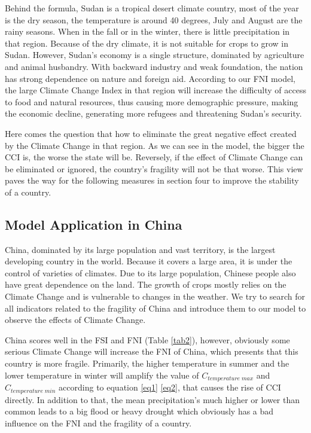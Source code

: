 \documentclass[a4paper,12pt]{article}
\begin{document}
Behind the formula, Sudan is a tropical desert climate country, most of the year is the dry season, the temperature is around 40 degrees, July and August are the rainy seasons. When in the fall or in the winter, there is little precipitation in that region. Because of the dry climate, it is not suitable for crops to grow in Sudan. However, Sudan's economy is a single structure, dominated by agriculture and animal husbandry. With backward industry and weak foundation, the nation has strong dependence on nature and foreign aid. According to our FNI model, the large Climate Change Index in that region will increase the difficulty of access to food and natural resources, thus causing more demographic pressure, making the economic decline, generating more refugees and threatening Sudan's security.

Here comes the question that how to eliminate the great negative effect created by the Climate Change in that region. As we can see in the model, the bigger the CCI is, the worse the state will be. Reversely, if the effect of Climate Change can be eliminated or ignored, the country's fragility will not be that worse. This view paves the way for the following measures in section four to improve the stability of a country.  

\subsection{Model Application in China}

China, dominated by its large population and vast territory, is the largest developing country in the world. Because it covers a large area, it is under the control of varieties of climates. Due to its large population, Chinese people also have great dependence on the land. The growth of crops mostly relies on the Climate Change and is vulnerable to changes in the weather. We try to search for all indicators related to the fragility of China and introduce them to our model to observe the effects of Climate Change.

China scores well in the FSI and FNI (Table \ref{tab2}), however, obviously some serious Climate Change will increase the FNI of China, which presents that this country is more fragile. Primarily, the higher temperature in summer and the lower temperature in winter will amplify the value of $C_{temperature\;max}$ and $C_{temperature\;min}$ according to equation \eqref{eq1} \eqref{eq2}, that causes the rise of CCI directly. In addition to that, the mean precipitation's much higher or lower than common leads to a big flood or heavy drought which obviously has a bad influence on the FNI and the fragility of a country.
\end{document}
